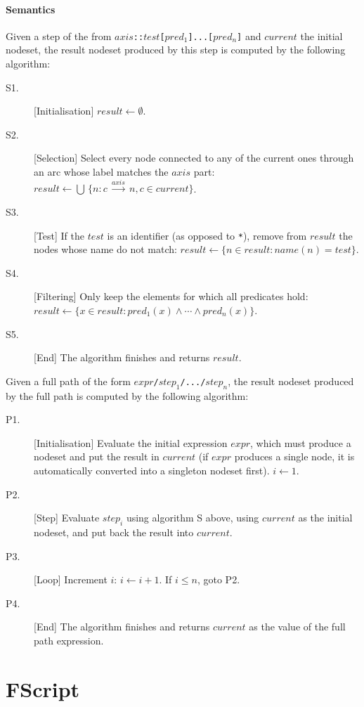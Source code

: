 \documentclass[a4paper,12pt]{report}
\begin{document}
\subsubsection{Semantics}
\label{sec:path-semantics}

Given a step of the from \texttt{$axis$::$test$[$pred_1$]...[$pred_n$]} and $current$ the
initial nodeset, the result nodeset produced by this step is computed by the following
algorithm:
\begin{description}
\item[S1.] [Initialisation] $result \leftarrow \emptyset$.
\item[S2.] [Selection] Select every node connected to any of the current ones through an
  arc whose label matches the $axis$ part: $result \leftarrow \bigcup\, \{ n : c\,
  \stackrel{axis}{\longrightarrow}\, n, c \in current \}$.
\item[S3.] [Test] If the $test$ is an identifier (as opposed to \texttt{*}), remove from
  $result$ the nodes whose name do not match: $result \leftarrow \{ n \in result : name(n)
  = test \}$.
\item[S4.] [Filtering] Only keep the elements for which all predicates hold: $result
  \leftarrow \{ x \in result : pred_1(x) \wedge \cdots \wedge pred_n(x) \}$.
\item[S5.] [End] The algorithm finishes and returns $result$.
\end{description}

Given a full path of the form \texttt{$expr$/$step_1$/.../$step_n$}, the result nodeset
produced by the full path is computed by the following algorithm:
\begin{description}
\item[P1.] [Initialisation] Evaluate the initial expression $expr$, which must produce a
  nodeset and put the result in $current$ (if $expr$ produces a single node, it is
  automatically converted into a singleton nodeset first). $i \leftarrow 1$.
\item[P2.] [Step] Evaluate $step_i$ using algorithm S above, using $current$ as the
  initial nodeset, and put back the result into $current$.
\item[P3.] [Loop] Increment $i$: $i \leftarrow i + 1$. If $i \leq n$, goto P2.
\item[P4.] [End] The algorithm finishes and returns $current$ as the value of the full
  path expression.
\end{description}

\chapter{FScript}
\label{cha:fscript}
\end{document}
